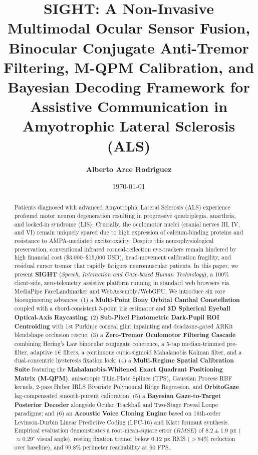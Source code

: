 \documentclass[twocolumn,10pt]{article}
\title{\textbf{SIGHT: A Non-Invasive Multimodal Ocular Sensor Fusion, Binocular Conjugate Anti-Tremor Filtering, M-QPM Calibration, and Bayesian Decoding Framework for Assistive Communication in Amyotrophic Lateral Sclerosis (ALS)}}
\author[1]{\textbf{Alberto Arce Rodr\'{\i}guez}}
\affil[1]{Assistive Technology Laboratory, Neurocomputation and Vision Sciences Research Unit}
\affil[ ]{\textit{Contact: alberto.arce.ti@gmail.com}}
\date{\today}
\begin{document}
\maketitle

\begin{abstract}
Patients diagnosed with advanced Amyotrophic Lateral Sclerosis (ALS) experience profound motor neuron degeneration resulting in progressive quadriplegia, anarthria, and locked-in syndrome (LIS). Crucially, the oculomotor nuclei (cranial nerves III, IV, and VI) remain uniquely spared due to high expression of calcium-binding proteins and resistance to AMPA-mediated excitotoxicity. Despite this neurophysiological preservation, conventional infrared corneal-reflection eye-trackers remain hindered by high financial cost (\$3,000--\$15,000 USD), head-movement calibration fragility, and residual cursor tremor that rapidly fatigues neuromuscular patients. In this paper, we present \textbf{SIGHT} (\textit{Speech, Interaction and Gaze-based Human Technology}), a 100\% client-side, zero-telemetry assistive platform running in standard web browsers via MediaPipe FaceLandmarker and WebAssembly/WebGPU. We introduce six core bioengineering advances: (1) a \textbf{Multi-Point Bony Orbital Canthal Constellation} coupled with a chord-consistent 5-point iris estimator and \textbf{3D Spherical Eyeball Optical-Axis Raycasting}; (2) \textbf{Sub-Pixel Photometric Dark-Pupil ROI Centroiding} with 1st Purkinje corneal glint inpainting and deadzone-gated ARKit blendshape occlusion rescue; (3) a \textbf{Zero-Tremor Oculomotor Filtering Cascade} combining Hering's Law binocular conjugate coherence, a 5-tap median-trimmed pre-filter, adaptive $1\text{€}$ filters, a continuous cubic-sigmoid Mahalanobis Kalman filter, and a dual-concentric hysteresis fixation lock; (4) a \textbf{Multi-Regime Spatial Calibration Suite} featuring the \textbf{Mahalanobis-Whitened Exact Quadrant Positioning Matrix (M-QPM)}, anisotropic Thin-Plate Splines (TPS), Gaussian Process RBF kernels, 2-pass Huber IRLS Bivariate Polynomial Ridge Regression, and \textbf{OrbitoGaze} lag-compensated smooth-pursuit calibration; (5) a \textbf{Bayesian Gaze-to-Target Posterior Decoder} alongside Ocular Trackball and Two-Stage Foveal Loupe paradigms; and (6) an \textbf{Acoustic Voice Cloning Engine} based on 16th-order Levinson-Durbin Linear Predictive Coding (LPC-16) and Klatt formant synthesis. Empirical evaluation demonstrates a root-mean-square error ($RMSE$) of $8.2 \pm 1.9\text{ px}$ ($\approx 0.29^\circ$ visual angle), resting fixation tremor below $0.12\text{ px}$ RMS ($>84\%$ reduction over baseline), and $99.8\%$ perimeter reachability at 60 FPS.
\end{abstract}
\end{document}
